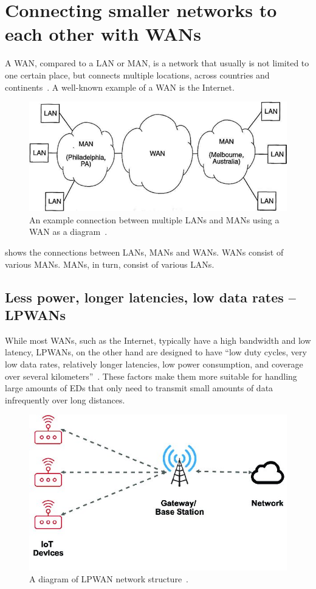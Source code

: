 \section{Connecting smaller networks to each other with \aclp{WAN}}

A \ac{WAN}, compared to a \acf{LAN} or \acf{MAN}, is a network that usually is not limited to one certain place, but connects multiple locations, across countries and continents~\cite[p. 2]{sadiku_fundamentals_2022}.
A well-known example of a \ac{WAN} is the Internet.

\begin{figure}[htbp]
    \centering
    \includegraphics[width=.6\textwidth]{pictures/lorawan-structure/wan_diagram.png}
    \caption[An example connection between multiple \aclp{LAN} and \aclp{MAN}.]{
        An example connection between multiple \acp{LAN} and \acp{MAN} using a \acf{WAN} as a diagram~\protect\cite{sadiku_fundamentals_2022}.
    }\label{pic:wan-diagram}
\end{figure}

 shows the connections between \acp{LAN}, \acp{MAN} and \acp{WAN}.
\acp{WAN} consist of various \acp{MAN}.
\acp{MAN}, in turn, consist of various \acp{LAN}.

\subsection{Less power, longer latencies, low data rates – \aclp{LPWAN}}

While most \acp{WAN}, such as the Internet, typically have a high bandwidth and low latency, \acp{LPWAN}, on the other hand are designed to have ``low duty cycles, very low data rates, relatively longer latencies, low power consumption, and coverage over several kilometers''~\cite[p. 289]{kumar_connecting_2023}.
These factors make them more suitable for handling large amounts of \aclp{ED} that only need to transmit small amounts of data infrequently over long distances.

\begin{figure}[htbp]
    \centering
    \includegraphics[width=.5\textwidth]{pictures/lorawan-structure/lpwan_network_structure.jpg}
    \caption[A diagram of \acl{LPWAN} network structure]{
        A diagram of \ac{LPWAN} network structure~\protect\cite{fernandez_assessing_2020}.
    }\label{pic:lpwan-diagram}
\end{figure}

